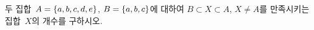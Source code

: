 두 집합~$A=\{a{,}\mkern3mu\mathopen{}b{,}\mkern3mu\mathopen{}c{,}\mkern3mu\mathopen{}d{,}\mkern3mu\mathopen{}e\}$, $B=\{a{,}\mkern3mu\mathopen{}b{,}\mkern3mu\mathopen{}c\}$에 대하여 $B\subset X\subset A$, $X\ne A$를 만족시키는 집합~$X$의 개수를 구하시오.
